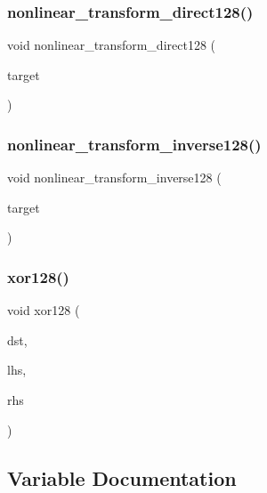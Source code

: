\subsubsection{nonlinear\+\_\+transform\+\_\+direct128()}
{\footnotesize\ttfamily void nonlinear\+\_\+transform\+\_\+direct128 (\begin{DoxyParamCaption}\item[{\textbf{ B\+Y\+TE} $\ast$}]{target }\end{DoxyParamCaption})}

\mbox{\label{_kuznyechik_8cpp_a11a1474d375e9873e7f0a7d767172224}} 
\subsubsection{nonlinear\+\_\+transform\+\_\+inverse128()}
{\footnotesize\ttfamily void nonlinear\+\_\+transform\+\_\+inverse128 (\begin{DoxyParamCaption}\item[{\textbf{ B\+Y\+TE} $\ast$}]{target }\end{DoxyParamCaption})}

\mbox{\label{_kuznyechik_8cpp_a3f08fc776d31c06ef35c5661ae6a7321}} 
\subsubsection{xor128()}
{\footnotesize\ttfamily void xor128 (\begin{DoxyParamCaption}\item[{\textbf{ B\+Y\+TE} $\ast$}]{dst,  }\item[{const \textbf{ B\+Y\+TE} $\ast$}]{lhs,  }\item[{const \textbf{ B\+Y\+TE} $\ast$}]{rhs }\end{DoxyParamCaption})}



\subsection{Variable Documentation}
\mbox{\label{_kuznyechik_8cpp_a738fdfdb3d726b5901c4676939341de6}} 
